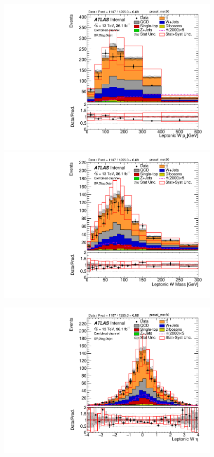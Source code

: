 \begin{figure}[!h]
\begin{center}
\includegraphics[scale=0.33]{./figures/boosted/PlotsInMbbSR/Unblinded/DataMC_2tag_0bjet_SR_lepton_presel_met50_WlepPt}
\includegraphics[scale=0.33]{./figures/boosted/PlotsInMbbSR/Unblinded/DataMC_2tag_0bjet_SR_lepton_presel_met50_WlepMass} \\
\par\medskip
\includegraphics[scale=0.33]{./figures/boosted/PlotsInMbbSR/Unblinded/DataMC_2tag_0bjet_SR_lepton_presel_met50_WlepEta} 

\end{center}
\end{figure}
